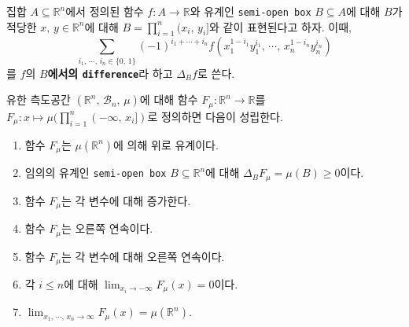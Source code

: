 \begin{definition}
    집합 $A\subseteq\mathbb{R}^n$에서 정의된 함수 $f:A\to\mathbb{R}$와 유계인 \texttt{semi-open box} $B\subseteq A$에 대해 $B$가 적당한 $x,\,y\in\mathbb{R}^n$에 대해 $B=\prod_{i=1}^n(x_i,\,y_i]$와 같이 표현된다고 하자. 이때,
    \begin{equation*}
        \sum_{i_1,\,\cdots,\,i_n\in\{0,\,1\}}(-1)^{i_1+\cdots+i_n}f(x_1^{1-i_1}y_1^{i_1},\,\cdots,\,x_n^{1-i_n}y_n^{i_n})
    \end{equation*}
     를 $f$의 \textbf{$B$에서의 \texttt{difference}}라 하고 $\Delta_Bf$로 쓴다.
\end{definition}

\begin{theorem}\label{thm:distributionProp}
    유한 측도공간 $(\mathbb{R}^n,\,\mathcal{B}_n,\,\mu)$에 대해 함수 $F_\mu:\mathbb{R}^n\to\mathbb{R}$를 $F_\mu:x\mapsto\mu(\prod_{i=1}^n(-\infty,\,x_i])$로 정의하면 다음이 성립한다.

    \begin{enumerate}
        \item 함수 $F_\mu$는 $\mu(\mathbb{R}^n)$에 의해 위로 유계이다.
        \item 임의의 유계인 \texttt{semi-open box} $B\subseteq\mathbb{R}^n$에 대해 $\Delta_BF_\mu=\mu(B)\geq0$이다.
        \item 함수 $F_\mu$는 각 변수에 대해 증가한다.
        \item 함수 $F_\mu$는 오른쪽 연속이다.
        \item 함수 $F_\mu$는 각 변수에 대해 오른쪽 연속이다.
        \item 각 $i\leq n$에 대해 $\lim_{x_i\to-\infty}F_\mu(x)=0$이다.\footnotemark
        \item $\lim_{x_1,\,\cdots,\,x_n\to\infty}F_\mu(x)=\mu(\mathbb{R}^n)$.\footnotemark
    \end{enumerate}
\end{theorem}

